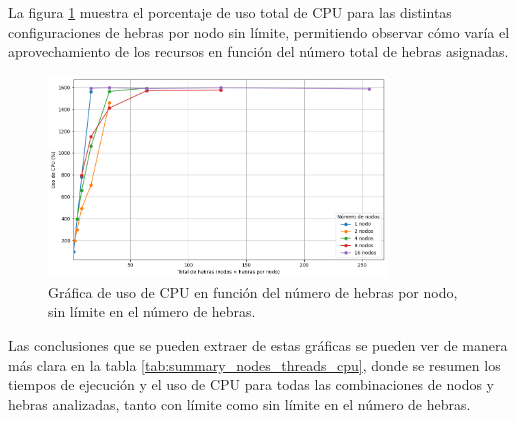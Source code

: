 La figura \ref{fig:exploratory_threads_no-limit_cpu} muestra el porcentaje de uso total de CPU para las distintas configuraciones de hebras por nodo sin límite, permitiendo observar cómo varía el aprovechamiento de los recursos en función del número total de hebras asignadas.

\begin{figure}[ht]
    \centering
    \includegraphics[width=0.8\textwidth]{imagenes/cap5/exploratory_threads_no-limit_cpu.png}
    \caption{Gráfica de uso de CPU en función del número de hebras por nodo, sin límite en el número de hebras.}
    \label{fig:exploratory_threads_no-limit_cpu}
\end{figure}

Las conclusiones que se pueden extraer de estas gráficas se pueden ver de manera más clara en la tabla \ref{tab:summary_nodes_threads_cpu}, donde se resumen los tiempos de ejecución y el uso de CPU para todas las combinaciones de nodos y hebras analizadas, tanto con límite como sin límite en el número de hebras.

